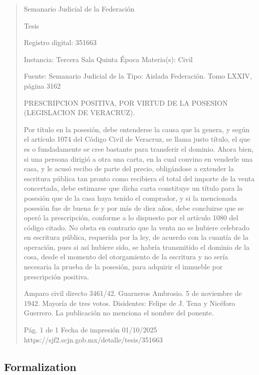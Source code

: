 \documentclass[11pt,a4paper]{article}
\begin{document}
\begin{quote}
                                                   Semanario Judicial de la Federación

                                                  Tesis

 Registro digital: 351663

 Instancia: Tercera Sala          Quinta Época                          Materia(s): Civil

                                  Fuente: Semanario Judicial de la      Tipo: Aislada
                                  Federación.
                                  Tomo LXXIV, página 3162


PRESCRIPCION POSITIVA, POR VIRTUD DE LA POSESION (LEGISLACION DE VERACRUZ).


Por título en la posesión, debe entenderse la causa que la genera, y según el artículo 1074 del
Código Civil de Veracruz, se llama justo título, el que es o fundadamente se cree bastante para
transferir el dominio. Ahora bien, si una persona dirigió a otra una carta, en la cual convino en
venderle una casa, y le acusó recibo de parte del precio, obligándose a extender la escritura pública
tan pronto como recibiera el total del importe de la venta concertada, debe estimarse que dicha
carta constituye un título para la posesión que de la casa haya tenido el comprador, y si la
mencionada posesión fue de buena fe y por más de diez años, debe concluirse que se operó la
prescripción, conforme a lo dispuesto por el artículo 1080 del código citado. No obsta en contrario
que la venta no se hubiere celebrado en escritura pública, requerida por la ley, de acuerdo con la
cuantía de la operación, pues si así hubiere sido, se habría transmitido el dominio de la cosa, desde
el momento del otorgamiento de la escritura y no sería necesaria la prueba de la posesión, para
adquirir el inmueble por prescripción positiva.


Amparo civil directo 3461/42. Guarneros Ambrosio. 5 de noviembre de 1942. Mayoría de tres votos.
Disidentes: Felipe de J. Tena y Nicéforo Guerrero. La publicación no menciona el nombre del
ponente.




                                             Pág. 1 de 1             Fecha de impresión 01/10/2025
  https://sjf2.scjn.gob.mx/detalle/tesis/351663

\end{quote}

\subsection{Formalization}
\end{document}
